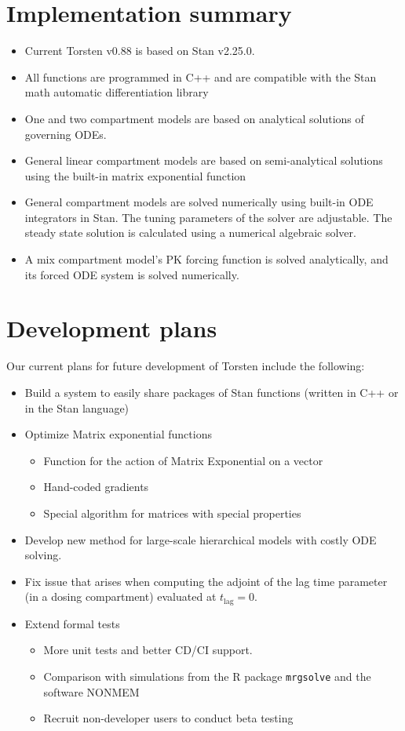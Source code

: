 \documentclass[11pt, reqno, oneside]{amsbook}
\numberwithin{equation}{chapter}
\numberwithin{figure}{chapter}
\numberwithin{table}{chapter}
\theoremstyle{remark}
\begin{document}
\section{Implementation summary}
\label{imp_details}
\begin{itemize}
\item Current Torsten v0.88 is based on Stan v2.25.0.
\item All functions are programmed in C++ and are compatible
with the Stan math automatic differentiation library \cite{carpenter15_stan_math_librar}
\item One and two compartment models are based on analytical solutions of governing ODEs.
\item General linear compartment models are based on semi-analytical solutions using the built-in matrix exponential function
\item General compartment models are solved numerically using built-in ODE integrators in Stan. The tuning parameters of the solver are adjustable. The steady state solution is calculated using a numerical algebraic solver.
\item A mix compartment model's PK forcing function is solved analytically, and its forced ODE system is solved numerically.
\end{itemize}

\section{Development plans}
\label{dev_plans}
Our current plans for future development of Torsten include the
following:
\begin{itemize}
\item Build a system to easily share packages of Stan functions
(written in C++ or in the Stan language)
\item Optimize Matrix exponential functions
\begin{itemize}
\item Function for the action of Matrix Exponential on a vector
\item Hand-coded gradients
\item Special algorithm for matrices with special properties
\end{itemize}
\item Develop new method for large-scale hierarchical models with costly
ODE solving.
\item Fix issue that arises when computing the adjoint of the lag time
parameter (in a dosing compartment) evaluated at \(t_{\text{lag}} = 0\).
\item Extend formal tests
\begin{itemize}
\item More unit tests and better CD/CI support.
\item Comparison with simulations from the R package
\texttt{mrgsolve} and the software NONMEM\textregistered{}
\item Recruit non-developer users to conduct beta testing
\end{itemize}
\end{itemize}
\end{document}

